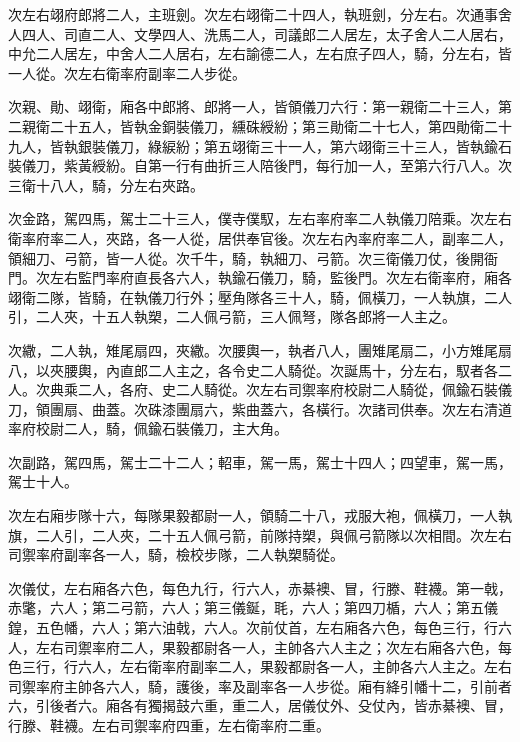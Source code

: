 \begin{pinyinscope}
 次左右翊府郎將二人，主班劍。次左右翊衛二十四人，執班劍，分左右。次通事舍人四人、司直二人、文學四人、洗馬二人，司議郎二人居左，太子舍人二人居右，中允二人居左，中舍人二人居右，左右諭德二人，左右庶子四人，騎，分左右，皆一人從。次左右衛率府副率二人步從。



 次親、勛、翊衛，廂各中郎將、郎將一人，皆領儀刀六行：第一親衛二十三人，第二親衛二十五人，皆執金銅裝儀刀，纁硃綬紛；第三勛衛二十七人，第四勛衛二十九人，皆執銀裝儀刀，綠綟紛；第五翊衛三十一人，第六翊衛三十三人，皆執鍮石裝儀刀，紫黃綬紛。自第一行有曲折三人陪後門，每行加一人，至第六行八人。次三衛十八人，騎，分左右夾路。



 次金路，駕四馬，駕士二十三人，僕寺僕馭，左右率府率二人執儀刀陪乘。次左右衛率府率二人，夾路，各一人從，居供奉官後。次左右內率府率二人，副率二人，領細刀、弓箭，皆一人從。次千牛，騎，執細刀、弓箭。次三衛儀刀仗，後開衙門。次左右監門率府直長各六人，執鍮石儀刀，騎，監後門。次左右衛率府，廂各翊衛二隊，皆騎，在執儀刀行外；壓角隊各三十人，騎，佩橫刀，一人執旗，二人引，二人夾，十五人執槊，二人佩弓箭，三人佩弩，隊各郎將一人主之。



 次繖，二人執，雉尾扇四，夾繖。次腰輿一，執者八人，團雉尾扇二，小方雉尾扇八，以夾腰輿，內直郎二人主之，各令史二人騎從。次誕馬十，分左右，馭者各二人。次典乘二人，各府、史二人騎從。次左右司禦率府校尉二人騎從，佩鍮石裝儀刀，領團扇、曲蓋。次硃漆團扇六，紫曲蓋六，各橫行。次諸司供奉。次左右清道率府校尉二人，騎，佩鍮石裝儀刀，主大角。



 次副路，駕四馬，駕士二十二人；軺車，駕一馬，駕士十四人；四望車，駕一馬，駕士十人。



 次左右廂步隊十六，每隊果毅都尉一人，領騎二十八，戎服大袍，佩橫刀，一人執旗，二人引，二人夾，二十五人佩弓箭，前隊持槊，與佩弓箭隊以次相間。次左右司禦率府副率各一人，騎，檢校步隊，二人執槊騎從。



 次儀仗，左右廂各六色，每色九行，行六人，赤綦襖、冒，行滕、鞋襪。第一戟，赤氅，六人；第二弓箭，六人；第三儀鋋，毦，六人；第四刀楯，六人；第五儀鍠，五色幡，六人；第六油戟，六人。次前仗首，左右廂各六色，每色三行，行六人，左右司禦率府二人，果毅都尉各一人，主帥各六人主之；次左右廂各六色，每色三行，行六人，左右衛率府副率二人，果毅都尉各一人，主帥各六人主之。左右司禦率府主帥各六人，騎，護後，率及副率各一人步從。廂有絳引幡十二，引前者六，引後者六。廂各有獨揭鼓六重，重二人，居儀仗外、殳仗內，皆赤綦襖、冒，行滕、鞋襪。左右司禦率府四重，左右衛率府二重。




\end{pinyinscope}

